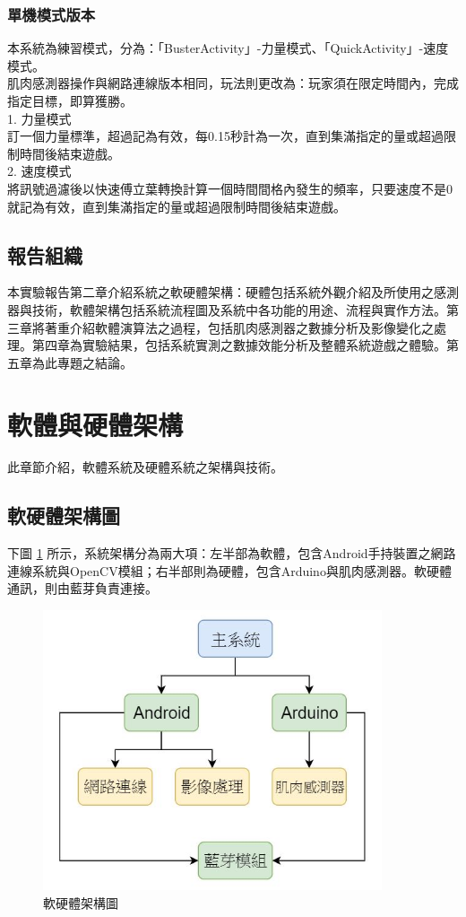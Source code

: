 \documentclass[12pt]{article}  %
\theoremstyle{plain}
\begin{document}
\subsubsection{單機模式版本}
本系統為練習模式，分為：「BusterActivity」-力量模式、「QuickActivity」-速度模式。\\
\indent 肌肉感測器操作與網路連線版本相同，玩法則更改為：玩家須在限定時間內，完成指定目標，即算獲勝。\\
1. 力量模式 \\
\indent 訂一個力量標準，超過記為有效，每0.15秒計為一次，直到集滿指定的量或超過限制時間後結束遊戲。\\
2. 速度模式 \\
\indent 將訊號過濾後以快速傅立葉轉換計算一個時間間格內發生的頻率，只要速度不是0就記為有效，直到集滿指定的量或超過限制時間後結束遊戲。\\

\subsection{報告組織}
本實驗報告第二章介紹系統之軟硬體架構：硬體包括系統外觀介紹及所使用之感測器與技術，軟體架構包括系統流程圖及系統中各功能的用途、流程與實作方法。第三章將著重介紹軟體演算法之過程，包括肌肉感測器之數據分析及影像變化之處理。第四章為實驗結果，包括系統實測之數據效能分析及整體系統遊戲之體驗。第五章為此專題之結論。\\
\newpage

\section{軟體與硬體架構}
此章節介紹，軟體系統及硬體系統之架構與技術。

\subsection{軟硬體架構圖}
下圖 \ref{軟硬體架構圖} 所示，系統架構分為兩大項：左半部為軟體，包含Android手持裝置之網路連線系統與OpenCV模組；右半部則為硬體，包含Arduino與肌肉感測器。軟硬體通訊，則由藍芽負責連接。
\begin{figure}[h]  %
\centering
\includegraphics[width=10cm]{pic/ch2/軟硬體架構圖.JPG}
\caption{軟硬體架構圖} \label{軟硬體架構圖}
\end{figure}
\end{document}
